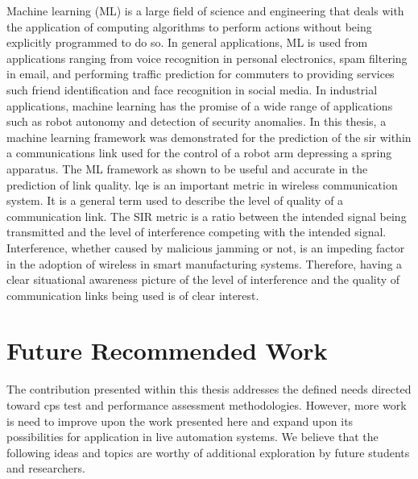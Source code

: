 Machine learning (ML) is a large field of science and engineering that deals with the application of computing algorithms to perform actions without being explicitly programmed to do so.  In general applications, ML is used from applications ranging from voice recognition in personal electronics, spam filtering in email, and performing traffic prediction for commuters to providing services such friend identification and face recognition in social media.  In industrial applications, machine learning has the promise of a wide range of applications such as robot autonomy and detection of security anomalies. In this thesis, a machine learning framework was demonstrated for the prediction of the \gls{sir} within a communications link used for the control of a robot arm depressing a spring apparatus.  The ML framework as shown to be useful and accurate in the prediction of link quality.  \Gls{lqe} is an important metric in wireless communication system.  It is a general term used to describe the level of quality of a communication link.  The SIR metric is a ratio between the intended signal being transmitted and the level of interference competing with the intended signal.  Interference, whether caused by malicious jamming or not, is an impeding factor in the adoption of wireless in smart manufacturing systems.  Therefore, having a clear situational awareness picture of the level of interference and the quality of communication links being used is of clear interest.  

\section{Future Recommended Work}

The contribution presented within this thesis addresses the defined needs directed toward \gls{cps} test and performance assessment methodologies.  However, more work is need to improve upon the work presented here and expand upon its possibilities for application in live automation systems.  We believe that the following ideas and topics are worthy of additional exploration by future students and researchers.

